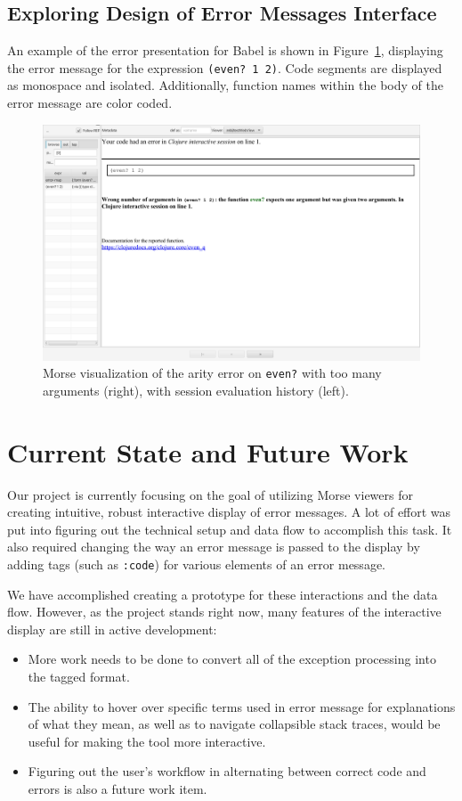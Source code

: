 \documentclass[12pt]{article}
\begin{document}
\subsection{Exploring Design of Error Messages Interface}\label{subsec:interface}
An example of the error presentation for Babel is shown in Figure~\ref{fig:babelview}, displaying the error message for the expression \texttt{(even? 1 2)}. 
Code segments are displayed as monospace and isolated. Additionally, function names within the body of the error message are color coded. 
\begin{figure}
	\centering
	\includegraphics[width=\linewidth]{resources/BabelViewerExample.png}
	\caption{Morse visualization of the arity error on \texttt{even?} with too many arguments (right), with session evaluation history (left).}
	\label{fig:babelview}
\end{figure}

\section{Current State and Future Work}\label{sec:conclusion}
Our project is currently focusing on the goal of utilizing Morse viewers for creating intuitive, robust interactive display of error messages. A lot of effort was put into figuring out the technical setup and data flow to accomplish this task. 
It also required changing the way an error message is passed to the display by adding tags (such as \texttt{:code}) for various elements of an error message.

We have accomplished creating a prototype for these interactions and the data flow. 
However, as the project stands right now, many features of the interactive display are still in active development:
\begin{itemize}
\item More work needs to be done to convert all of the exception processing into the tagged format. 
\item The ability to hover over specific terms used in error message for explanations of what they mean, as well as to navigate collapsible stack traces, would be useful for making the tool more interactive.
\item Figuring out the user's workflow in alternating between correct code and errors is also a future work item.
\end{itemize}
\end{document}
